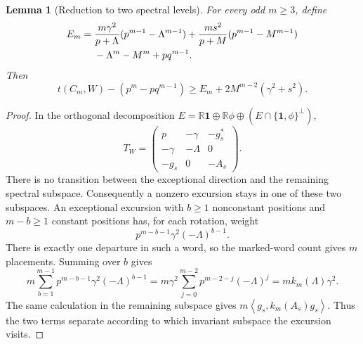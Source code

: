 \documentclass[11pt]{article}
\numberwithin{equation}{section}
\newtheorem{lemma}[theorem]{Lemma}
\newcommand{\one}{\mathbf 1}
\newcommand{\R}{\mathbb R}
\newcommand{\ip}[2]{\left\langle #1,#2\right\rangle}
\begin{document}
\begin{lemma}[Reduction to two spectral levels]\label{lem:two-levels}
For every odd $m\ge3$, define
\begin{align}\label{eq:E}
 E_m={}&\frac{m\gamma^2}{p+\Lambda}(p^{m-1}-\Lambda^{m-1})
 +\frac{ms^2}{p+M}(p^{m-1}-M^{m-1})\notag\\
 &-\Lambda^m-M^m+pq^{m-1}.
\end{align}
Then
\begin{equation}\label{eq:Ebound}
 t(C_m,W)-(p^m-pq^{m-1})\ge E_m+2M^{m-2}(\gamma^2+s^2).
\end{equation}
\end{lemma}
\begin{proof}
In the orthogonal decomposition
$E=\R\one\oplus\R\phi\oplus(E\cap\{\one,\phi\}^\perp)$,
\begin{equation}\label{eq:threeblocks}
 T_W=\begin{pmatrix}
 p&-\gamma&-g_s^*\\
 -\gamma&-\Lambda&0\\
 -g_s&0&-A_s
 \end{pmatrix}.
\end{equation}
There is no transition between the exceptional direction and the remaining spectral subspace. Consequently a nonzero excursion stays in one of these two subspaces. An exceptional excursion with $b\ge1$ nonconstant positions and $m-b\ge1$ constant positions has, for each rotation, weight
\[
 p^{m-b-1}\gamma^2(-\Lambda)^{b-1}.
\]
There is exactly one departure in such a word, so the marked-word
count gives $m$ placements. Summing over $b$ gives
\[
 m\sum_{b=1}^{m-1}p^{m-b-1}\gamma^2(-\Lambda)^{b-1}
  =m\gamma^2\sum_{j=0}^{m-2}p^{m-2-j}(-\Lambda)^j
  =m k_m(\Lambda)\gamma^2.
\]
The same calculation in the remaining subspace gives
$m\ip{g_s}{k_m(A_s)g_s}$. Thus the two terms separate according
to which invariant subspace the excursion visits.


\end{proof}
\end{document}
